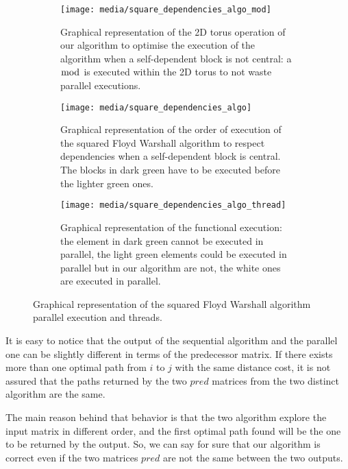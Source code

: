 \begin{figure}[htbp]
    \centering
    \begin{subfigure}[t]{0.3\textwidth}
        \texttt{[image: media/square\_dependencies\_algo\_mod]}
        
        \caption{Graphical representation of the 2D torus operation of our algorithm to optimise the execution of the algorithm when a self-dependent block is not central: a \(\bmod\) is executed within the 2D torus to not waste parallel executions.}
        \label{square-dependecies-circular}
    \end{subfigure}
    \hfill
    \begin{subfigure}[t]{0.3\textwidth}
        \texttt{[image: media/square\_dependencies\_algo]}
        
        \caption{Graphical representation of the order of execution of the squared Floyd Warshall algorithm to respect dependencies when a self-dependent block is central. The blocks in dark green have to be executed before the lighter green ones.}
        \label{square-dependecies-algo}
    \end{subfigure}
    \hfill
    \begin{subfigure}[t]{0.3\textwidth}
        \texttt{[image: media/square\_dependencies\_algo\_thread]}
        
        \caption{Graphical representation of the functional execution: the element in dark green cannot be executed in parallel, the light green elements could be executed in parallel but in our algorithm are not, the white ones are executed in parallel.}
        \label{square-dependecies-thread}
    \end{subfigure}
    \caption{Graphical representation of the squared Floyd Warshall algorithm parallel execution and threads.}
    \label{square-algo}
\end{figure}

It is easy to notice that the output of the sequential algorithm and the parallel one can be slightly different in terms of the predecessor matrix. If there exists more than one optimal path from \(i\) to \(j\) with the same distance cost, it is not assured that the paths returned by the two \(pred\) matrices from the two distinct algorithm are the same. 

The main reason behind that behavior is that the two algorithm explore the input matrix in different order, and the first optimal path found will be the one to be returned by the output. So, we can say for sure that our algorithm is correct even if the two matrices \(pred\) are not the same between the two outputs.

\FloatBarrier
